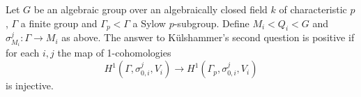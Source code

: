 \begin{theorem}
  Let $G$ be an algebraic group over an algebraically closed field $k$ of characteristic $p$, $\Gamma$ a finite group and $\Gamma_p < \Gamma$ a Sylow $p$-subgroup. Define $M_i < Q_i < G$ and $\sigma_{M_i}^{j}:\Gamma \rightarrow M_{i}$ as above. The answer to K\"ulshammer's second question is positive if for each $i,j$ the map of 1-cohomologies
  \begin{displaymath}
    H^{1}(\Gamma, \sigma_{0,i}^{j}, V_{i}) \rightarrow H^{1}(\Gamma_{p}, \sigma_{0,i}^{j}, V_{i})
  \end{displaymath}
  is injective.
  \label{k2_h1}
\end{theorem}

% 
% 
% 
% 
% 

